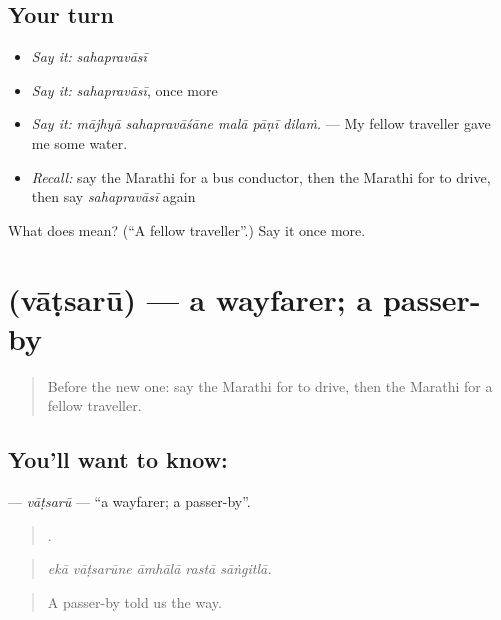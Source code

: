 \subsection*{Your turn}
\begin{itemize}
\raggedright
  \item \emph{Say it:} \emph{sahapravāsī}
  \item \emph{Say it:} \emph{sahapravāsī}, once more
  \item \emph{Say it:} \emph{mājhyā sahapravāśāne malā pāṇī dilaṁ.} — My fellow traveller gave me some water.
  \item \emph{Recall:} say the Marathi for a bus conductor, then the Marathi for to drive, then say \emph{sahapravāsī} again
\end{itemize}

\begin{tcolorbox}[breakable,colback=teal!4,colframe=teal!35!black,title={Before you move on}]
What does  mean? (\textquotedblleft{}A fellow traveller\textquotedblright{}.) Say it once more.
\end{tcolorbox}
\section[\texorpdfstring{\mr{वाटसरू} (vāṭsarū)}{वाटसरू (vāṭsarū)}]{ (vāṭsarū) — a wayfarer; a passer-by}

\label{lesson:MR-C399-vatsaru}



\begin{quote}
Before the new one: say the Marathi for to drive, then the Marathi for a fellow traveller.
\end{quote}

\subsection*{You'll want to know: }
\textbf{} — \emph{vāṭsarū} — \textquotedblleft{}a wayfarer; a passer-by\textquotedblright{}.

\begin{quote}
    .
\end{quote}

\begin{quote}
\emph{ekā vāṭsarūne āmhālā rastā sāṅgitlā.}
\end{quote}

\begin{quote}
A passer-by told us the way.
\end{quote}

